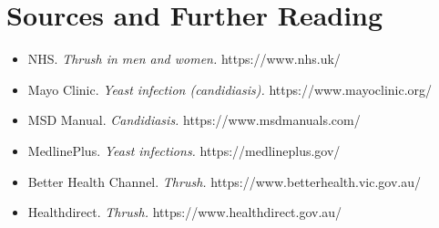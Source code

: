\section*{Sources and Further Reading}
\begin{itemize}
    \item NHS. \textit{Thrush in men and women.} https://www.nhs.uk/
    \item Mayo Clinic. \textit{Yeast infection (candidiasis).} https://www.mayoclinic.org/
    \item MSD Manual. \textit{Candidiasis.} https://www.msdmanuals.com/
    \item MedlinePlus. \textit{Yeast infections.} https://medlineplus.gov/
    \item Better Health Channel. \textit{Thrush.} https://www.betterhealth.vic.gov.au/
    \item Healthdirect. \textit{Thrush.} https://www.healthdirect.gov.au/
\end{itemize}
